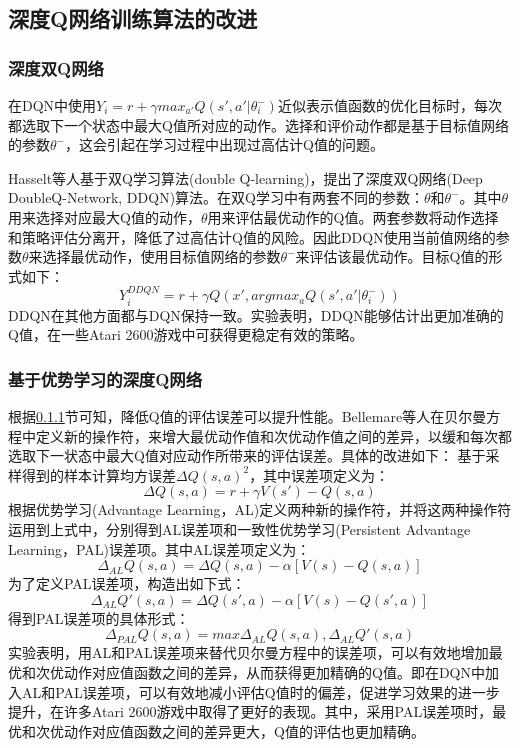 \documentclass[bachelor]{thesis-uestc}
\begin{document}
	\subsection{深度Q网络训练算法的改进}
	\subsubsection{深度双Q网络}\label{sec1}
	在DQN中使用$Y_i=r+\gamma max_{a'}Q(s',a'|\theta_i^-)$近似表示值函数的优化目标时，每次都选取下一个状态中最大Q值所对应的动作。选择和评价动作都是基于目标值网络的参数$\theta^-$，这会引起在学习过程中出现过高估计Q值的问题。
	
	Hasselt等人基于双Q学习算法(double Q-learning)，提出了深度双Q网络(Deep DoubleQ-Network, DDQN)算法。在双Q学习中有两套不同的参数：$\theta$和$\theta^-$。其中$\theta$用来选择对应最大Q值的动作，$\theta$用来评估最优动作的Q值。两套参数将动作选择和策略评估分离开，降低了过高估计Q值的风险。因此DDQN使用当前值网络的参数$\theta$来选择最优动作，使用目标值网络的参数$\theta^-$来评估该最优动作。目标Q值的形式如下：
	\begin{equation}
		\label{eq8}
		Y_i^{DDQN}=r+\gamma Q(x',argmax_a Q(s',a'|\theta_i^-))
	\end{equation}
	DDQN在其他方面都与DQN保持一致。实验表明，DDQN能够估计出更加准确的Q值，在一些Atari 2600游戏中可获得更稳定有效的策略。
	
	\subsubsection{基于优势学习的深度Q网络}
	根据\ref{sec1}节可知，降低Q值的评估误差可以提升性能。Bellemare等人在贝尔曼方程中定义新的操作符，来增大最优动作值和次优动作值之间的差异，以缓和每次都选取下一状态中最大Q值对应动作所带来的评估误差。具体的改进如下：
	基于采样得到的样本计算均方误差$\Delta Q(s,a)^2$，其中误差项定义为：
	\begin{equation}
		\label{eq9}
		\Delta Q(s,a)=r+\gamma V(s')-Q(s,a)
	\end{equation}
	根据优势学习(Advantage Learning，AL)定义两种新的操作符，并将这两种操作符运用到上式中，分别得到AL误差项和一致性优势学习(Persistent Advantage Learning，PAL)误差项。其中AL误差项定义为：
	\begin{equation}
		\label{eq10}
		\Delta_{AL}Q(s,a)=\Delta Q(s,a)-\alpha[V(s)-Q(s,a)]
	\end{equation}
	为了定义PAL误差项，构造出如下式：
	\begin{equation}
		\label{eq11}
		\Delta_{AL}Q'(s,a)=\Delta Q(s',a)-\alpha[V(s)-Q(s',a)]
	\end{equation}
	得到PAL误差项的具体形式：
	\begin{equation}
		\label{eq12}
		\Delta_{PAL}Q(s,a)=max{\Delta_{AL}Q(s,a),\Delta_{AL}Q'(s,a)}
	\end{equation}
	实验表明，用AL和PAL误差项来替代贝尔曼方程中的误差项，可以有效地增加最优和次优动作对应值函数之间的差异，从而获得更加精确的Q值。即在DQN中加入AL和PAL误差项，可以有效地减小评估Q值时的偏差，促进学习效果的进一步提升，在许多Atari 2600游戏中取得了更好的表现。其中，采用PAL误差项时，最优和次优动作对应值函数之间的差异更大，Q值的评估也更加精确。
	
\end{document}
